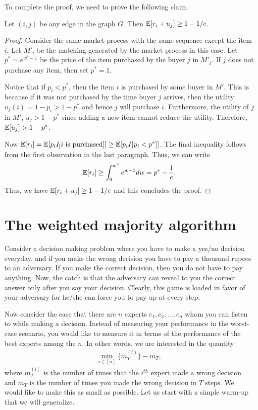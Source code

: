To complete the proof, we need to prove the following claim.
\begin{claim}
	Let $(i,j)$ be any edge in the graph $G$. Then $\mathbb{E}[r_i + u_j] \geq 1 - 1/e$.
\end{claim}
\begin{proof}
	Consider the same market process with the same sequence except the item $i$. Let $M'_i$ be the matching generated by the market process in this case. Let $p^* = e^{w^* - 1}$ be the price of the item purchased by the buyer $j$ in $M'_j$. If $j$ does not purchase any item, then set $p^* = 1$. 
	
	Notice that if $p_i < p^*$, then the item $i$ is purchased by some buyer in $M'$. This is because if it was not purchased by the time buyer $j$ arrives, then the utility $u_j(i) = 1 - p_i > 1 - p^*$ and hence $j$ will purchase $i$. Furthermore, the utility of $j$ in $M'$, $u_j > 1 - p^*$ since adding a new item cannot reduce the utility. Therefore, $\mathbb{E}[u_j] > 1 - p^*$. 
	
	Now $\mathbb{E}[r_i] = \mathbb{E}[p_i I_[\text{$i$ is purchased}]] \geq \mathbb{E}[p_i I[p_i < p^*]]$. The final inequality follows from the first observation in the last paragraph. Thus, we can write
	\begin{align*}
		\mathbb{E}[r_i] \geq \int_{0}^{w^*} e^{w-1} dw = p^* - \frac{1}{e}.
	\end{align*}
    Thus, we have $\mathbb{E}[r_i + u_j] \geq 1 - 1/e$ and this concludes the proof.
\end{proof}


\section{The weighted majority algorithm}

Consider a decision making problem where you have to make a yes/no decision everyday, and if you make the wrong decision you have to pay a thousand rupees to an adversary. If you make the correct decision, then you do not have to pay anything. Now, the catch is that the adversary can reveal to you the correct answer only after you say your decision. Clearly, this game is loaded in favor of your adversary for he/she can force you to pay up at every step.

Now consider the case that there are $n$ experts $e_1, e_2, \ldots, e_n$ whom you can listen to while making a decision. Instead of measuring your performance in the worst-case scenario, you would like to measure it in terms of the performance of the best experts among the $n$. In other words, we are interested in the quantity
\begin{align*}
	\min_{i\in [n]} \{ m^{(i)}_T \} - m_T,
\end{align*}
where $m^{(i)}_T$ is the number of times that the $i^{th}$ expert made a wrong decision and $m_T$ is the number of times you made the wrong decision in $T$ steps. We would like to make this as small as possible. Let us start with a simple warm-up that we will generalize.


